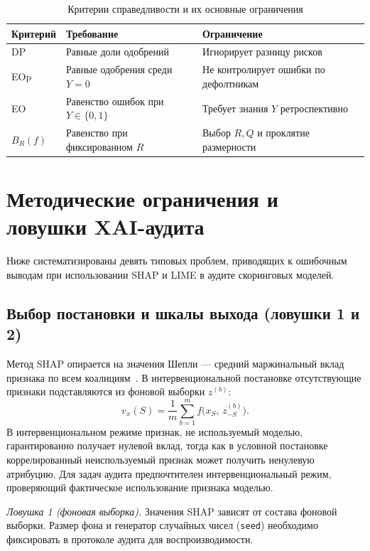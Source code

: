 \documentclass{misisarticle}
\begin{document}
\begin{table}[t]
\centering
\caption{Критерии справедливости и их основные ограничения}
\label{tab:fairness}
\footnotesize
\begin{tabular}{@{} >{\raggedright\arraybackslash}p{} >{\raggedright\arraybackslash}p{} >{\raggedright\arraybackslash}p{} @{}}
\toprule
Критерий & Требование & Ограничение \\
\midrule
DP & Равные доли одобрений & Игнорирует разницу рисков \\
EOp & Равные одобрения среди $Y = 0$ & Не контролирует ошибки по дефолтникам \\
EO & Равенство ошибок при $Y \in \{0, 1\}$ & Требует знания $Y$ ретроспективно \\
$B_R(f)$ & Равенство при фиксированном $R$ & Выбор $R, Q$ и проклятие размерности \\
\bottomrule
\end{tabular}
\end{table}

\section{Методические ограничения и ловушки XAI-аудита}

Ниже систематизированы девять типовых проблем, приводящих к ошибочным выводам при использовании SHAP и LIME в аудите скоринговых моделей.

\subsection{Выбор постановки и шкалы выхода (ловушки 1 и 2)}

Метод SHAP опирается на значения Шепли — средний маржинальный вклад признака по всем коалициям~\cite{lundberg2017}. В интервенциональной постановке отсутствующие признаки подставляются из фоновой выборки $z^{(b)}$:
\begin{equation}
v_x(S) = \frac{1}{m}\sum_{b=1}^{m} f\bigl(x_S,\, z_{-S}^{(b)}\bigr).
\label{eq:interventional}
\end{equation}
В интервенциональном режиме признак, не используемый моделью, гарантированно получает нулевой вклад, тогда как в условной постановке коррелированный неиспользуемый признак может получить ненулевую атрибуцию. Для задач аудита предпочтителен интервенциональный режим, проверяющий фактическое использование признака моделью.

\emph{Ловушка 1 (фоновая выборка).} Значения SHAP зависят от состава фоновой выборки. Размер фона и генератор случайных чисел (\texttt{seed}) необходимо фиксировать в протоколе аудита для воспроизводимости.
\end{document}
